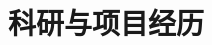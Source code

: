 \section{科研与项目经历}
  \resumeSubHeadingListStart
    
    
    
    
    
    
    
  \resumeSubHeadingListEnd
